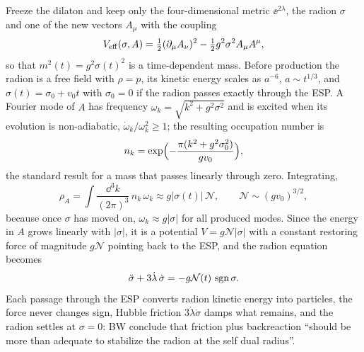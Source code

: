 Freeze the dilaton and keep only the four-dimensional metric $\ee^{2\lambda}$, the radion
$\sigma$ and one of the new vectors $A_\mu$ with the coupling 
\begin{equation}\label{eq:cosmology:Veff}
 V_{\rm eff}(\sigma,A)=\tfrac12(\partial_\mu A_\nu)^2-\tfrac12g^2\sigma^2A_\mu A^\mu ,
\end{equation}
so that $m^2(t)=g^2\sigma(t)^2$ is a time-dependent mass. Before production the radion is a
free field with $\rho=p$, its kinetic energy scales as $a^{-6}$, $a\sim t^{1/3}$, and
$\sigma(t)=\sigma_0+v_0t$ with $\sigma_0=0$ if the radion passes exactly through the ESP.
 A Fourier mode of $A$ has frequency
$\omega_k=\sqrt{k^2+g^2\sigma^2}$ and is excited when its evolution is non-adiabatic,
$\dot\omega_k/\omega_k^2\ge1$; the resulting occupation number is
\begin{equation}\label{eq:cosmology:nk}
 n_k=\exp\Bigl(-\frac{\pi(k^2+g^2\sigma_0^2)}{gv_0}\Bigr),
\end{equation}
the standard result for a mass that passes linearly through zero. Integrating,
\begin{equation}\label{eq:cosmology:rhoA}
 \rho_A=\int\frac{\dd^3k}{(2\pi)^3}\,n_k\,\omega_k\approx g|\sigma(t)|\,\mathcal N,
 \qquad \mathcal N\sim(gv_0)^{3/2},
\end{equation}
because once $\sigma$ has moved on, $\omega_k\approx g|\sigma|$ for all produced modes.
Since the energy in $A$ grows linearly with $|\sigma|$, it is a potential $V=g\mathcal N|\sigma|$
with a constant restoring force of magnitude $g\mathcal N$ pointing back to the ESP, and the
radion equation becomes 
\begin{equation}\label{eq:cosmology:trap}
 \ddot\sigma+3\dot\lambda\,\dot\sigma=-g\mathcal N(t)\,\operatorname{sgn}\sigma .
\end{equation}
Each passage through the ESP converts radion kinetic energy into particles, the force never
changes sign, Hubble friction $3\dot\lambda\dot\sigma$ damps what remains, and the radion
settles at $\sigma=0$: BW conclude that friction plus backreaction ``should be more than
adequate to stabilize the radion at the self dual radius''. 

